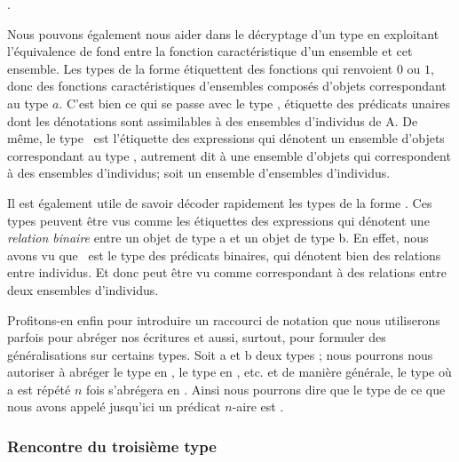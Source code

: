 \ex. 
\type{\underbrace{\et},\underbrace{\ett}}


Nous pouvons également nous aider dans le décryptage d'un type en exploitant l'équivalence de fond entre la fonction caractéristique d'un ensemble et cet ensemble. 
Les types de la forme  étiquettent des fonctions qui
renvoient $0$ ou $1$, donc des fonctions caractéristiques d'ensembles
composés d'objets correspondant au type $a$.  
C'est
bien ce qui se passe avec le type \et, étiquette des prédicats unaires dont les dénotations sont assimilables à des ensembles d'individus de \Unv A.  
De même, le type 
\ett\ est l'étiquette des expressions qui dénotent un ensemble d'objets correspondant au type {\et},  autrement dit à une ensemble d'objets qui correspondent à des ensembles d'individus; soit un ensemble d'ensembles d'individus.

\sloppy

Il est également utile de savoir décoder rapidement les types de la forme .  Ces types peuvent être vus comme les étiquettes des expressions qui dénotent une \emph{relation binaire} entre un objet de type \mtyp a et un objet de type \mtyp b. 
En effet, nous avons vu que \eet\ est le type des prédicats binaires, qui dénotent bien des relations entre individus. 
Et donc \type{\et,\ett} peut être vu comme correspondant à des relations entre deux ensembles d'individus. 

\fussy

Profitons-en enfin pour introduire un raccourci de notation que nous utiliserons parfois pour abréger nos écritures et aussi, surtout, pour formuler des généralisations sur certains types.  Soit \mtyp a et \mtyp b deux types ; nous pourrons nous autoriser à abréger le type  en , le type  en , etc. et de manière générale, le type  où \mtyp a est répété $n$ fois s'abrégera en .  Ainsi nous pourrons dire que le type de ce que nous avons appelé jusqu'ici un prédicat $n$-aire est .





\subsubsection{Rencontre du troisième type}
\label{ss:3etype}

